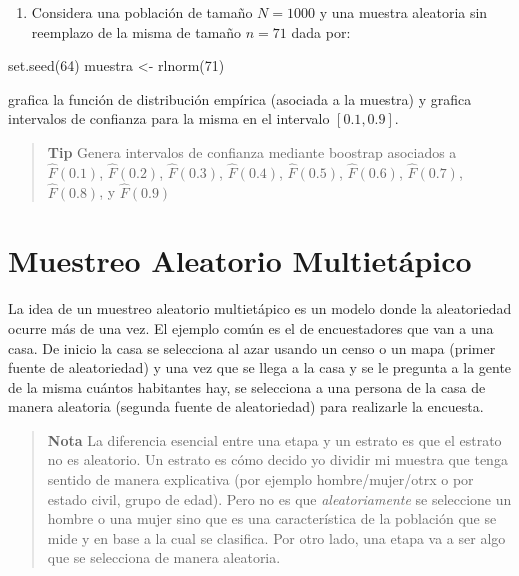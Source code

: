 \documentclass[
]{book}
\newenvironment{Shaded}{\begin{snugshade}}{\end{snugshade}}
\newcommand{\DecValTok}[1]{\textcolor[rgb]{0.00,0.00,0.81}{#1}}
\newcommand{\FunctionTok}[1]{\textcolor[rgb]{0.00,0.00,0.00}{#1}}
\newcommand{\NormalTok}[1]{#1}
\newcommand{\OtherTok}[1]{\textcolor[rgb]{0.56,0.35,0.01}{#1}}
\providecommand{\tightlist}{%
  \setlength{\itemsep}{0pt}\setlength{\parskip}{0pt}}
\begin{document}
\begin{enumerate}
\def\labelenumi{\arabic{enumi}.}
\setcounter{enumi}{3}
\tightlist
\item
  Considera una población de tamaño \(N = 1000\) y una muestra aleatoria sin reemplazo de la misma de tamaño \(n = 71\) dada por:
\end{enumerate}

\begin{Shaded}
\begin{Highlighting}[]
\FunctionTok{set.seed}\NormalTok{(}\DecValTok{64}\NormalTok{)}
\NormalTok{muestra }\OtherTok{\textless{}{-}} \FunctionTok{rlnorm}\NormalTok{(}\DecValTok{71}\NormalTok{)}
\end{Highlighting}
\end{Shaded}

grafica la función de distribución empírica (asociada a la muestra) y grafica intervalos de confianza para la misma en el intervalo \([0.1, 0.9]\).

\begin{quote}
\textbf{Tip} Genera intervalos de confianza mediante boostrap asociados a \(\hat{F}(0.1)\), \(\hat{F}(0.2)\), \(\hat{F}(0.3)\), \(\hat{F}(0.4)\), \(\hat{F}(0.5)\), \(\hat{F}(0.6)\), \(\hat{F}(0.7)\), \(\hat{F}(0.8)\), y \(\hat{F}(0.9)\)
\end{quote}

\hypertarget{muestreo-aleatorio-multietuxe1pico}{%
\chapter{Muestreo Aleatorio Multietápico}\label{muestreo-aleatorio-multietuxe1pico}}

La idea de un muestreo aleatorio multietápico es un modelo donde la aleatoriedad ocurre más de una vez. El ejemplo común es el de encuestadores que van a una casa. De inicio la casa se selecciona al azar usando un censo o un mapa (primer fuente de aleatoriedad) y una vez que se llega a la casa y se le pregunta a la gente de la misma cuántos habitantes hay, se selecciona a una persona de la casa de manera aleatoria (segunda fuente de aleatoriedad) para realizarle la encuesta.

\begin{quote}
\textbf{Nota} La diferencia esencial entre una etapa y un estrato es que el estrato no es aleatorio. Un estrato es cómo decido yo dividir mi muestra que tenga sentido de manera explicativa (por ejemplo hombre/mujer/otrx o por estado civil, grupo de edad). Pero no es que \emph{aleatoriamente} se seleccione un hombre o una mujer sino que es una característica de la población que se mide y en base a la cual se clasifica. Por otro lado, una etapa va a ser algo que se selecciona de manera aleatoria.
\end{quote}
\end{document}
